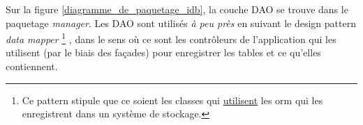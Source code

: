 Sur la figure \ref{diagramme_de_paquetage_idb}, la couche DAO se trouve dans le paquetage \textit{manager}.
Les DAO sont utilisés \textit{à peu près} en suivant le design pattern \textit{data mapper}
\footnote{\label{faux_data_mapper}Ce pattern stipule que ce soient les classes qui \underline{utilisent} les \gls{orm} qui les enregistrent dans un système de stockage.}
, dans le sens où ce sont les contrôleurs de l'application qui les utilisent (par le biais des façades) pour enregistrer les tables et ce qu'elles contiennent.


